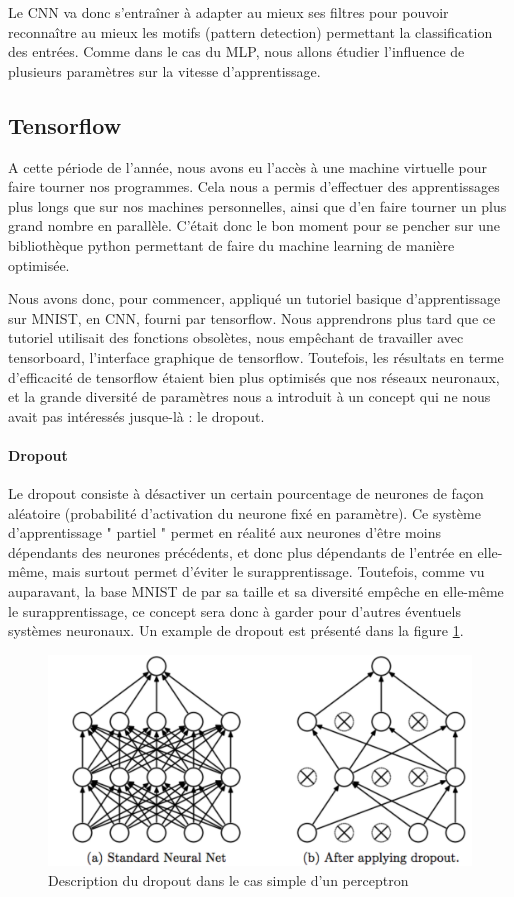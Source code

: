 \documentclass[
    10pt,
    a4paper,
    oneside,
    headinclude,footinclude,
    BCOR=5mm,
    captions=tableabove
]{scrartcl}
\begin{document}
Le CNN va donc s'entraîner à adapter au mieux ses filtres pour pouvoir reconnaître au mieux les motifs (pattern detection) permettant la classification des entrées. Comme dans le cas du MLP, nous allons étudier l'influence de plusieurs paramètres sur la vitesse d'apprentissage. 

\subsection{Tensorflow}

A cette période de l'année, nous avons eu l'accès à une machine virtuelle pour faire tourner nos programmes. Cela nous a permis d'effectuer des apprentissages plus longs que sur nos machines personnelles, ainsi que d'en faire tourner un plus grand nombre en parallèle. C'était donc le bon moment pour se pencher sur une bibliothèque python permettant de faire du machine learning de manière optimisée.

Nous avons donc, pour commencer, appliqué un tutoriel basique d'apprentissage sur MNIST, en CNN, fourni par tensorflow. Nous apprendrons plus tard que ce tutoriel utilisait des fonctions obsolètes, nous empêchant de travailler avec tensorboard, l'interface graphique de tensorflow. Toutefois, les résultats en terme d'efficacité de tensorflow étaient bien plus optimisés que nos réseaux neuronaux, et la grande diversité de paramètres nous a introduit à un concept qui ne nous avait pas intéressés jusque-là : le dropout.

\paragraph{Dropout}
Le dropout consiste à désactiver un certain pourcentage de neurones de façon aléatoire (probabilité d'activation du neurone fixé en paramètre). Ce système d'apprentissage " partiel " permet en réalité aux neurones d'être moins dépendants des neurones précédents, et donc plus dépendants de l'entrée en elle-même, mais surtout permet d'éviter le surapprentissage. Toutefois, comme vu auparavant, la base MNIST de par sa taille et sa diversité empêche en elle-même le surapprentissage, ce concept sera donc à garder pour d'autres éventuels systèmes neuronaux.
Un example de dropout est présenté dans la figure \ref{fig:dropout.PNG}.

\begin{figure}[h!]
\includegraphics[width=\linewidth]{dropout.PNG}
\centering
\caption{Description du dropout dans le cas simple d'un perceptron}
\label{fig:dropout.PNG}
\end{figure}
\end{document}
